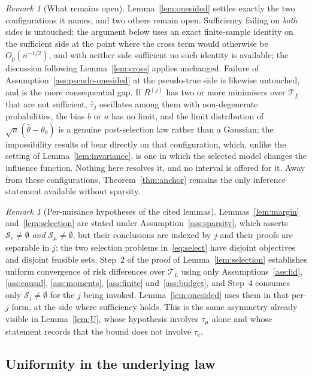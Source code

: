 \documentclass[11pt]{article}
\theoremstyle{plain}
\theoremstyle{definition}
\theoremstyle{remark}
\newtheorem{remark}[theorem]{Remark}
\newcommand{\cT}{\mathcal{T}}
\newcommand{\cS}{\mathcal{S}}
\newcommand{\that}{\widehat{\tau}}
\newcommand{\thetahat}{\widehat{\theta}}
\begin{document}
\begin{remark}[What remains open]\label{rem:onesided-open}
Lemma~\ref{lem:onesided} settles exactly the two configurations it names, and
two others remain open. Sufficiency failing on \emph{both} sides is untouched:
the argument below uses an exact finite-sample identity on the sufficient side
at the point where the cross term would otherwise be $O_p(n^{-1/2})$, and with
neither side sufficient no such identity is available; the discussion following
Lemma~\ref{lem:cross} applies unchanged. Failure of
Assumption~\ref{ass:pseudo-onesided} at the pseudo-true side is likewise
untouched, and is the more consequential gap. If $R^{(j)}$ has two or more
minimisers over $\cT_{\bar L}$ that are not sufficient, $\that_j$ oscillates
among them with non-degenerate probabilities, the bias $b$ or $a$ has no limit,
and the limit distribution of $\sqrt n(\thetahat-\theta_0)$ is a genuine
post-selection law rather than a Gaussian; the impossibility results of
\citet{leeb2005} bear directly on that configuration, which, unlike the setting
of Lemma~\ref{lem:invariance}, is one in which the selected model changes the
influence function. Nothing here resolves it, and no interval is offered for it.
Away from these configurations, Theorem~\ref{thm:anchor} remains the only
inference statement available without sparsity.
\end{remark}

\begin{remark}[Per-nuisance hypotheses of the cited lemmas]
\label{rem:onesided-perj}
Lemmas~\ref{lem:margin} and~\ref{lem:selection} are stated under
Assumption~\ref{ass:sparsity}, which asserts $\cS_e\ne\emptyset$ \emph{and}
$\cS_\mu\ne\emptyset$, but their conclusions are indexed by $j$ and their proofs
are separable in $j$: the two selection problems in~\eqref{eq:select} have
disjoint objectives and disjoint feasible sets, Step~2 of the proof of
Lemma~\ref{lem:selection} establishes uniform convergence of risk differences
over $\cT_{\bar L}$ using only
Assumptions~\ref{ass:iid}, \ref{ass:causal}, \ref{ass:moments},
\ref{ass:finite} and~\ref{ass:budget}, and Step~4 consumes only
$\cS_j\ne\emptyset$ for the $j$ being invoked. Lemma~\ref{lem:onesided} uses
them in that per-$j$ form, at the side where sufficiency holds. This is the same
asymmetry already visible in Lemma~\ref{lem:U}, whose hypothesis involves
$\tau_\mu$ alone and whose statement records that the bound does not involve
$\tau_e$.
\end{remark}

\subsection{Uniformity in the underlying law}\label{sec:uniformity}
\end{document}
